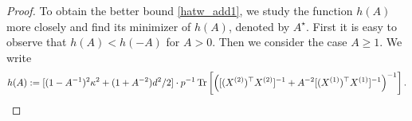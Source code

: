 \begin{proof}
To obtain the better bound \eqref{hatw_add1}, we study the function $h(A)$ more closely and find its minimizer of $h(A)$, denoted by $A^\star$. 
First it is easy to observe that $h(A)< h(-A)$ for $A> 0$. 
Then we consider the case $A\ge 1$. We write
\begin{align*}
h(A):= [(1-A^{-1})^2\kappa^2 + (1+A^{-2})d^2/2] \cdot p^{-1} \tr\left[\left([(X^{(2)})^\top X^{(2)}]^{-1} + A^{-2} [(X^{(1)})^\top X^{(1)}]^{-1}\right)^{-1}\right].

\end{align*}
\end{proof}
